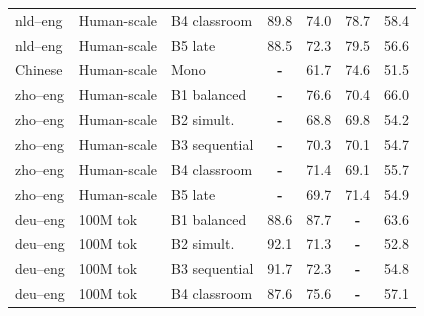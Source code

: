 \begin{table}[t]
\begin{tabular}{lll cc cc}
nld--eng & Human-scale & B4 classroom & \cellcolor[rgb]{0.780,1.000,0.780} 89.8 & \cellcolor[rgb]{0.869,1.000,0.869} 74.0 & \cellcolor[rgb]{0.796,1.000,0.796} 78.7 & \cellcolor[rgb]{0.931,1.000,0.931} 58.4 \\
nld--eng & Human-scale & B5 late & \cellcolor[rgb]{0.787,1.000,0.787} 88.5 & \cellcolor[rgb]{0.878,1.000,0.878} 72.3 & \cellcolor[rgb]{0.790,1.000,0.790} 79.5 & \cellcolor[rgb]{0.946,1.000,0.946} 56.6 \\
Chinese & Human-scale & Mono & \textbf{-} & \cellcolor[rgb]{0.936,1.000,0.936} 61.7 & \cellcolor[rgb]{0.825,1.000,0.825} 74.6 & \cellcolor[rgb]{0.988,1.000,0.988} 51.5 \\
zho--eng & Human-scale & B1 balanced & \textbf{-} & \cellcolor[rgb]{0.855,1.000,0.855} 76.6 & \cellcolor[rgb]{0.855,1.000,0.855} 70.4 & \cellcolor[rgb]{0.868,1.000,0.868} 66.0 \\
zho--eng & Human-scale & B2 simult. & \textbf{-} & \cellcolor[rgb]{0.897,1.000,0.897} 68.8 & \cellcolor[rgb]{0.859,1.000,0.859} 69.8 & \cellcolor[rgb]{0.965,1.000,0.965} 54.2 \\
zho--eng & Human-scale & B3 sequential & \textbf{-} & \cellcolor[rgb]{0.889,1.000,0.889} 70.3 & \cellcolor[rgb]{0.857,1.000,0.857} 70.1 & \cellcolor[rgb]{0.961,1.000,0.961} 54.7 \\
zho--eng & Human-scale & B4 classroom & \textbf{-} & \cellcolor[rgb]{0.883,1.000,0.883} 71.4 & \cellcolor[rgb]{0.864,1.000,0.864} 69.1 & \cellcolor[rgb]{0.953,1.000,0.953} 55.7 \\
zho--eng & Human-scale & B5 late & \textbf{-} & \cellcolor[rgb]{0.893,1.000,0.893} 69.7 & \cellcolor[rgb]{0.848,1.000,0.848} 71.4 & \cellcolor[rgb]{0.960,1.000,0.960} 54.9 \\
\midrule
deu--eng & 100M tok & B1 balanced & \cellcolor[rgb]{0.786,1.000,0.786} 88.6 & \cellcolor[rgb]{0.794,1.000,0.794} 87.7 & \textbf{-} & \cellcolor[rgb]{0.888,1.000,0.888} 63.6 \\
deu--eng & 100M tok & B2 simult. & \cellcolor[rgb]{0.767,1.000,0.767} 92.1 & \cellcolor[rgb]{0.884,1.000,0.884} 71.3 & \textbf{-} & \cellcolor[rgb]{0.977,1.000,0.977} 52.8 \\
deu--eng & 100M tok & B3 sequential & \cellcolor[rgb]{0.769,1.000,0.769} 91.7 & \cellcolor[rgb]{0.878,1.000,0.878} 72.3 & \textbf{-} & \cellcolor[rgb]{0.960,1.000,0.960} 54.8 \\
deu--eng  & 100M tok & B4 classroom & \cellcolor[rgb]{0.792,1.000,0.792} 87.6 & \cellcolor[rgb]{0.860,1.000,0.860} 75.6 & \textbf{-} & \cellcolor[rgb]{0.942,1.000,0.942} 57.1 \\

\end{tabular}
\end{table}
